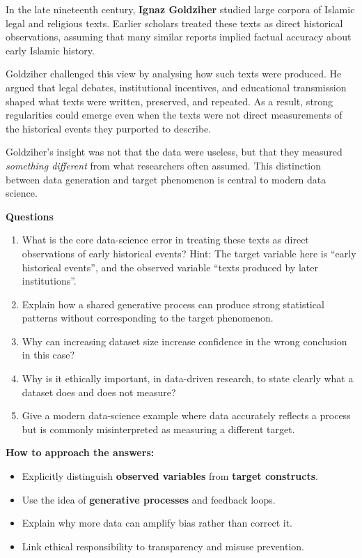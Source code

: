 \documentclass[
  12pt,
]{book}
\providecommand{\tightlist}{%
  \setlength{\itemsep}{0pt}\setlength{\parskip}{0pt}}
\begin{document}
In the late nineteenth century, \textbf{Ignaz Goldziher} studied large corpora of Islamic legal and religious texts. Earlier scholars treated these texts as direct historical observations, assuming that many similar reports implied factual accuracy about early Islamic history.

Goldziher challenged this view by analysing how such texts were produced. He argued that legal debates, institutional incentives, and educational transmission shaped what texts were written, preserved, and repeated. As a result, strong regularities could emerge even when the texts were not direct measurements of the historical events they purported to describe.

Goldziher's insight was not that the data were useless, but that they measured \emph{something different} from what researchers often assumed. This distinction between data generation and target phenomenon is central to modern data science.

\textbf{Questions}

\begin{enumerate}
\def\labelenumi{\arabic{enumi}.}
\tightlist
\item
  What is the core data-science error in treating these texts as direct observations of early historical events? Hint: The target variable here is ``early historical events'', and the observed variable ``texts produced by later institutions''.\\
\item
  Explain how a shared generative process can produce strong statistical patterns without corresponding to the target phenomenon.\\
\item
  Why can increasing dataset size increase confidence in the wrong conclusion in this case?\\
\item
  Why is it ethically important, in data-driven research, to state clearly what a dataset does and does not measure?\\
\item
  Give a modern data-science example where data accurately reflects a process but is commonly misinterpreted as measuring a different target.
\end{enumerate}

\textbf{How to approach the answers:}

\begin{itemize}
\tightlist
\item
  Explicitly distinguish \textbf{observed variables} from \textbf{target constructs}.
\item
  Use the idea of \textbf{generative processes} and feedback loops.
\item
  Explain why more data can amplify bias rather than correct it.
\item
  Link ethical responsibility to transparency and misuse prevention.
\end{itemize}
\end{document}
